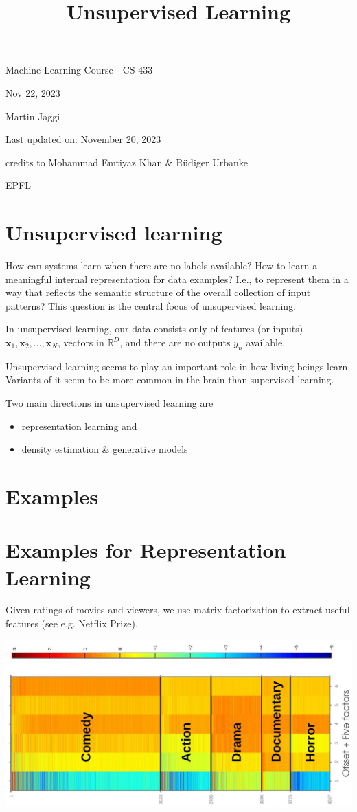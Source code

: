 \documentclass[10pt]{article}
\title{Unsupervised Learning }
\author{}
\date{}
\begin{document}
\maketitle
Machine Learning Course - CS-433

Nov 22, 2023

Martin Jaggi

Last updated on: November 20, 2023

credits to Mohammad Emtiyaz Khan \& Rüdiger Urbanke

EPFL

\section*{Unsupervised learning}
How can systems learn when there are no labels available? How to learn a meaningful internal representation for data examples? I.e., to represent them in a way that reflects the semantic structure of the overall collection of input patterns? This question is the central focus of unsupervised learning.

In unsupervised learning, our data consists only of features (or inputs) $\mathbf{x}_{1}, \mathbf{x}_{2}, \ldots, \mathbf{x}_{N}$, vectors in $\mathbb{R}^{D}$, and there are no outputs $y_{n}$ available.

Unsupervised learning seems to play an important role in how living beings learn. Variants of it seem to be more common in the brain than supervised learning.

Two main directions in unsupervised learning are

\begin{itemize}
  \item representation learning and
  \item density estimation \& generative models
\end{itemize}

\section*{Examples}
\section*{Examples for Representation Learning}
Given ratings of movies and viewers, we use matrix factorization to extract useful features (see e.g. Netflix Prize).

\begin{center}
\includegraphics[max width=\textwidth]{2024_01_08_e090cb7d953bac87fc33g-03(3)}
\end{center}
\end{document}
